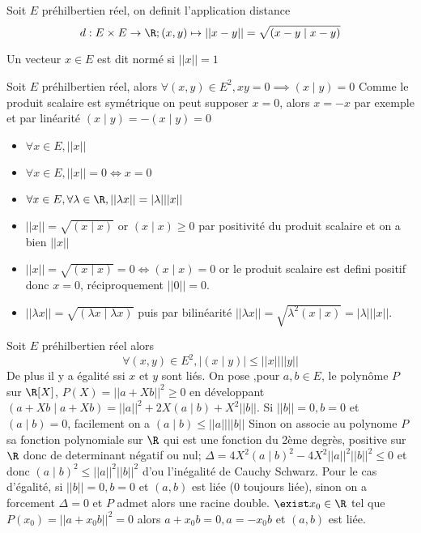 \begin{defini}
    Soit $E$ préhilbertien réel, on definit l'application distance $$d: E \times E \to \R; (x,y)\mapsto ||x-y||=\sqrt{(x-y\mid x-y)}$$
\end{defini}
\begin{defini}
    Un vecteur $x\in E$ est dit normé si $||x||=1$
\end{defini}
\begin{prop}
    Soit $E$ préhilbertien réel, alors $\forall(x,y)\in E^2, xy=0\implies (x\mid y)=0$
    \tcblower
    Comme le produit scalaire est symétrique on peut supposer $x=0$, alors $x=-x$ par exemple et par linéarité $(x\mid y)=-(x\mid y)=0$
\end{prop}
\begin{prop}
    \begin{itemize}
        \item $\forall x\in E, ||x||$
        \item $\forall x\in E, ||x||=0 \iff x=0$
        \item $ \forall x\in E, \forall \lambda \in \R, ||\lambda x||=|\lambda| ||x||$
    \end{itemize}
    \tcblower
    \begin{itemize}
        \item $||x||=\sqrt{(x\mid x)}$ or $(x\mid x)\geq 0$ par positivité du produit scalaire et on a bien $||x||$
        \item $||x||=\sqrt{(x\mid x)}=0\iff (x\mid x)=0$ or le produit scalaire est defini positif donc $x=0$, réciproquement $||0||=0$.
        \item $||\lambda x||=\sqrt{(\lambda x\mid \lambda x)}$ puis par bilinéarité $||\lambda x||=\sqrt{\lambda^2( x\mid x)}=|\lambda| ||x||$.
    \end{itemize}
\end{prop}
\begin{prop}
    Soit $E$ préhilbertien réel alors $$\forall (x,y)\in E^2, |(x\mid y)|\leq ||x|| ||y||$$
    De plus il y a égalité ssi $x$ et $y$ sont liés.
    \tcblower
    On pose ,pour $a,b\in E$, le polynôme $P$ sur $\R [X]$, $P(X)=||a+Xb||^2\geq 0$ en développant $(a+Xb\mid a+Xb)=||a||^2+2X(a\mid b)+X^2||b||$.
    Si $||b||=0,b=0$ et $(a\mid b)=0$, facilement on a $(a\mid b)\leq ||a|| ||b||$
    Sinon on associe au polynome $P$ sa fonction polynomiale sur $\R$ qui est une fonction du 2ème degrès, positive sur $\R$ donc de determinant négatif ou nul; $\Delta = 4X^2(a\mid b)^2-4X^2||a||^2||b||^2\leq 0$ et donc $(a\mid b)^2\leq ||a||^2||b||^2$ d'ou l'inégalité de Cauchy Schwarz.
    Pour le cas d'égalité, si $||b||=0,b=0$ et $(a,b)$ est liée (0 toujours liée), sinon on a forcement $\Delta=0$ et $P$ admet alors une racine double. $\exist x_0\in \R$ tel que $P(x_0)=||a+x_0b||^2=0$ alors $a+x_0b=0,a=-x_0b$ et $(a,b)$ est liée.
\end{prop}
\begin{prop}
     
\end{prop}